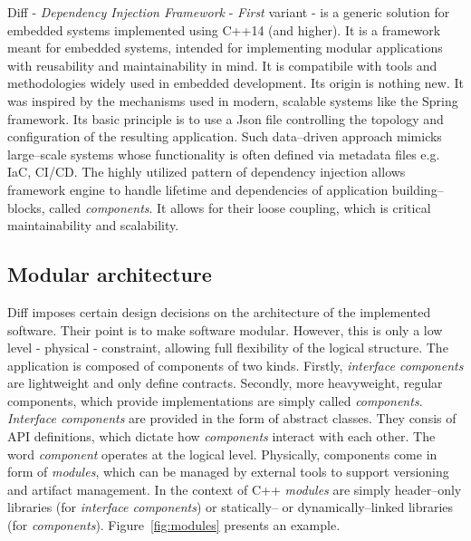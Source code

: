 \documentclass[preprint,12pt, a4paper]{elsarticle}
\begin{document}
Diff - \textit{Dependency Injection Framework} - \textit{First} variant - is a generic solution for embedded systems implemented using C++14 (and higher). It is a framework meant for embedded systems, intended for implementing modular applications with reusability and maintainability in mind. It is compatibile with tools and methodologies widely used in embedded development. Its origin is nothing new. It was inspired by the mechanisms used in modern, scalable systems like the Spring framework. Its basic principle is to use a Json file controlling the topology and configuration of the resulting application. Such data--driven approach mimicks large--scale systems whose functionality is often defined via metadata files e.g. IaC, CI/CD. The highly utilized pattern of dependency injection allows framework engine to handle lifetime and dependencies of application building--blocks, called \textit{components}. It allows for their loose coupling, which is critical maintainability and scalability.

\subsection{Modular architecture}
Diff imposes certain design decisions on the architecture of the implemented software. Their point is to make software modular. However, this is only a low level - physical - constraint, allowing full flexibility of the logical structure. The application is composed of components of two kinds. Firstly, \textit{interface components} are lightweight and only define contracts. Secondly, more heavyweight, regular components, which provide implementations are simply called \textit{components}. \textit{Interface components} are provided in the form of abstract classes. They consis of API definitions, which dictate how \textit{components} interact with each other. The word \textit{component} operates at the logical level. Physically, components come in form of \textit{modules}, which can be managed by external tools to support versioning and artifact management. In the context of C++ \textit{modules} are simply header--only libraries (for \textit{interface components}) or statically-- or dynamically--linked libraries (for \textit{components}). Figure~\ref{fig:modules} presents an example.


\end{document}
